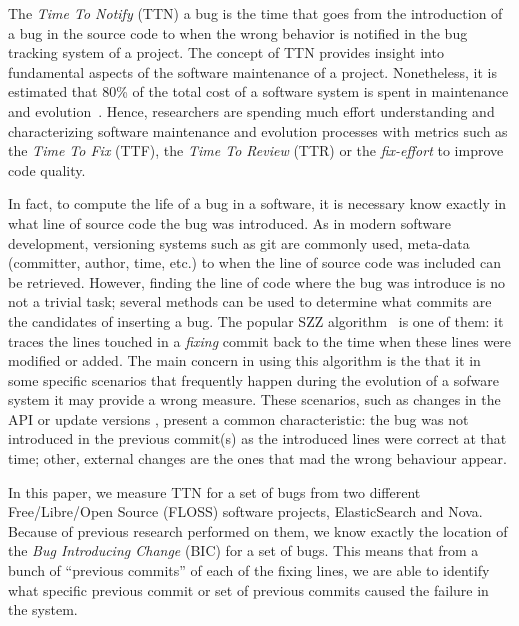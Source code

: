 \documentclass[10pt, conference]{IEEEtran}
\begin{document}
The \emph{Time To Notify} (TTN) a bug is the time that goes from the introduction of a bug in the source code to when the wrong behavior is notified in the bug tracking system of a project. The concept of TTN provides insight into fundamental aspects of the software maintenance of a project. Nonetheless, it is estimated that 80\% of the total cost of a software system is spent in maintenance and evolution~\cite{tassey2002economic}. Hence, researchers are spending much effort understanding and characterizing software maintenance and evolution processes with metrics such as the \emph{Time To Fix} (TTF), the \emph{Time To Review} (TTR) or the \emph{fix-effort} to improve code quality.

In fact, to compute the life of a bug in a software, it is necessary know exactly in what line of source code the bug was introduced. As in modern software development, versioning systems such as git are commonly used, meta-data (committer, author, time, etc.) to when the line of source code was included can be retrieved. However, finding the line of code where the bug was introduce is no not a trivial task; several methods can be used to determine what commits are the candidates of inserting a bug. The popular SZZ algorithm~\cite{sliwerski2005changes} is one of them: it traces the lines touched in a \emph{fixing} commit back to the time when these lines were modified or added. The main concern in using this algorithm is the that it in some specific scenarios that frequently happen during the evolution of a sofware system it may provide a wrong measure. These scenarios, such as changes in the API or update versions , present a common characteristic: the bug was not introduced in the  previous commit(s) as the introduced lines were correct at that time; other, external changes are the ones that mad the wrong behaviour appear. 


In this paper, we measure TTN for a set of bugs from two different Free/Libre/Open Source (FLOSS) software projects, ElasticSearch and Nova. Because of previous research performed on them, we know exactly the location of the \emph{Bug Introducing Change} (BIC) for a set of bugs. This means that from a bunch of ``previous commits'' of each of the fixing lines, we are able to identify what specific previous commit or set of previous commits caused the failure in the system.
\end{document}
